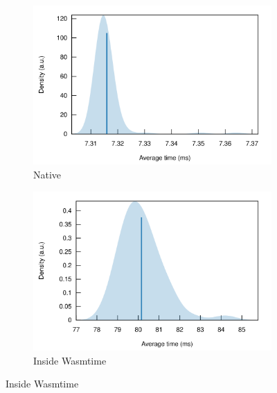 \begin{figure}[h]
\centering
\begin{subfigure}{.5\textwidth}
  \centering
  \includegraphics[width=\linewidth]{figures/native_hat_2}
  \caption{Native}
  \label{fig:native_hat}
\end{subfigure}%
\begin{subfigure}{.5\textwidth}
  \centering
  \includegraphics[width=\linewidth]{figures/wasmtime_hat}
  \caption{Inside Wasmtime}
  \label{fig:wasmtime_hat}
\end{subfigure}


\end{figure}
